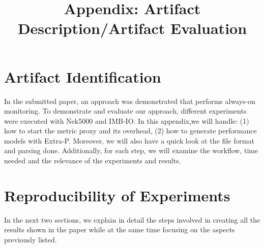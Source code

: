 \documentclass[sigconf,nonacm=true]{acmart}
\title[On Enabling Continuous Optimization for HPC Workloads]{Appendix: Artifact Description/Artifact Evaluation}
\begin{document}
\acmPrice{}
\acmDOI{}
\acmISBN{}

\sloppy
\maketitle


\renewcommand{\shortauthors}{ Tarraf, et al. }

\section*{Artifact Identification}
In the submitted paper, an approach was demonstrated that performs always-on monitoring. To demonstrate and evaluate our approach, 
different experiments were executed with Nek5000 and IMB-IO. In this appendix,we will 
handle: 
(1) how to start the metric proxy and its overhead, 
(2) how to generate performance models with Extra-P. 
Moreover, we will also have a quick look at the file format and parsing done. 
Additionally, for each step, we will examine the workflow, time needed and the relevance 
of the experiments and results.

\section*{Reproducibility of Experiments}
In the next two sections, we explain in detail the steps involved in creating all the results shown in the paper while 
at the same time focusing on the aspects previously listed. 




\end{document}

